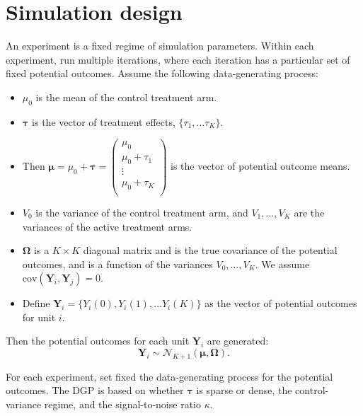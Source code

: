 \documentclass{article}
\newcommand{\bsY}{\boldsymbol Y}
\newcommand{\bsmu}{\boldsymbol \mu}
\newcommand{\bsOmega}{\boldsymbol \Omega}
\newcommand{\bstau}{\boldsymbol \tau}
\def\cov{\text{cov}}
\begin{document}
\section{Simulation design}\label{sec:sim_design}

An experiment is a fixed regime of simulation parameters. Within each experiment, run multiple iterations, where each iteration has a particular set of fixed potential outcomes. Assume the following data-generating process:

\begin{itemize}
    \item $\mu_0$ is the mean of the control treatment arm.
    \item $\bstau$ is the vector of treatment effects, $\{\tau_1, \dots \tau_K\}$.
    \item Then $\bsmu = \mu_0 + \bstau = \begin{pmatrix} \mu_0 \\ \mu_0 + \tau_1 \\ \vdots \\ \mu_0 + \tau_{K} \\ \end{pmatrix}$ is the vector of potential outcome means.
    \item $V_0$ is the variance of the control treatment arm, and $V_1, \dots, V_K$ are the variances of the active treatment arms.
    \item $\bsOmega$ is a $K \times K$ diagonal matrix and is the true covariance of the potential outcomes, and is a function of the variances $V_0, \dots, V_K$. We assume $\cov(\mathbf{Y}_i, \mathbf{Y}_j) = 0$.
    \item Define $\bsY_i = \{Y_i(0), Y_i(1), \dots Y_i(K)\}$ as the vector of potential outcomes for unit $i$.
\end{itemize}

Then the potential outcomes for each unit $\bsY_i$ are generated:
\[ \mathbf{Y}_i \sim \mathcal{N}_{K + 1}\left(\bsmu,\bsOmega \right).\]

For each experiment, set fixed the data-generating process for the potential outcomes. The DGP is based on whether $\bstau$ is sparse or dense, the control-variance regime, and the signal-to-noise ratio $\kappa$.
\end{document}
